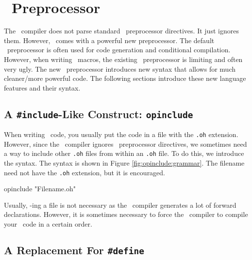 
\chapter{\opCPP\ Preprocessor}
\label{chap:opcpp_preprocessor}

The \opCPP\ compiler does not parse standard \cpp\ preprocessor directives.  It just ignores them.  However, \opCPP\ comes with a powerful new preprocessor.  The default \cpp\ preprocessor is often used for code generation and conditional compilation.  However, when writing \cpp\ macros, the existing \cpp\ preprocessor is limiting and often very ugly.  The new \opCPP\ preprocessor introduces new syntax that allows for much cleaner/more powerful code.  The following sections introduce these new language features and their syntax.

\section{A {\tt \#include}-Like Construct: {\tt opinclude}}
\label{sec:opinclude}

When writing \opCPP\ code, you usually put the code in a file with the {\tt .oh} extension.  However, since the \opCPP\ compiler ignores \cpp\ preprocessor directives, we sometimes need a way to include other {\tt .oh} files from within an {\tt .oh} file.  To do this, we introduce the  syntax.  The syntax is shown in Figure \ref{fig:opinclude:grammar}.  The filename need not have the {\tt .oh} extension, but it is encouraged.

\begin{opcpp}[label={fig:opinclude:grammar},caption={Using the \opcppk{opinclude} syntax.}]
opinclude "Filename.oh"
\end{opcpp}

Usually, -ing a file is not necessary as the \opCPP\ compiler generates a lot of forward declarations.  However, it is sometimes necessary to force the \opCPP\ compiler to compile your \opCPP\ code in a certain order. 

\section{A Replacement For {\tt \#define}}
\label{sec:opdefine}

